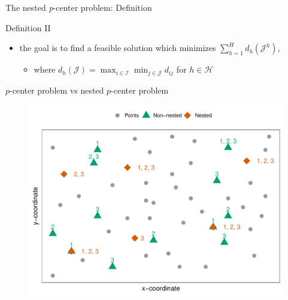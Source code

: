 \documentclass[utf8,aspectratio=169,ngerman,english]{beamer}
\begin{document}
\begin{frame}{The nested \textit{p}-center problem: Definition}
\begin{minipage}{0.48\textwidth}
\begin{block}{Definition II}
\begin{itemize}
                      \begin{itemize}
                          \item with $\left\lvert \mathcal J^h \right\rvert = p^h$ for $h \in \mathcal H$,
                          \item for which $\mathcal J^h \subseteq \mathcal J^{h+1}$ for $h = 1, \dots, H-1$ holds \pause
                      \end{itemize}
                \item the goal is to find a feasible solution which minimizes $\sum_{h = 1}^{H} d_h(\mathcal J^h)$,
                      \begin{itemize}
                          \item where $d_h(\mathcal J) = \max_{i \in \mathcal I}\min_{j \in \mathcal J} d_{ij}$ for $h \in \mathcal H$
                      \end{itemize}
            \end{itemize}
        \end{block}
    \end{minipage}
\end{frame}

\begin{frame}{$p$-center problem vs nested $p$-center problem}
    \centering
    \begin{figure}
        \includegraphics[width=0.55\linewidth]{images/Rplot01.pdf}
    \end{figure}
\end{frame}
\end{document}
